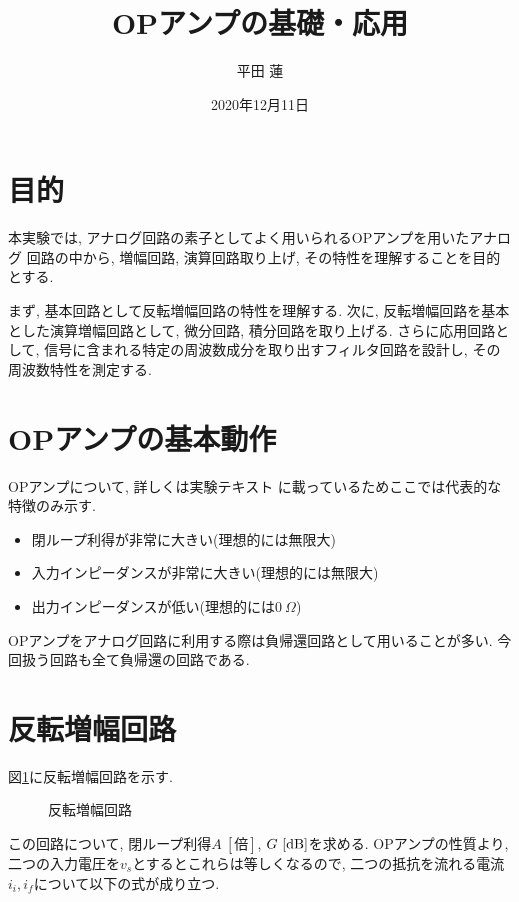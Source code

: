 \documentclass[titlepage]{jsarticle}
\title{OPアンプの基礎・応用}
\author{平田 蓮}
\date{2020年12月11日}
\begin{document}
\maketitle
\section{目的}
    本実験では, アナログ回路の素子としてよく用いられるOPアンプを用いたアナログ
    回路の中から, 増幅回路, 演算回路取り上げ, その特性を理解することを目的とする.

    まず, 基本回路として反転増幅回路の特性を理解する.
    次に, 反転増幅回路を基本とした演算増幅回路として,
    微分回路, 積分回路を取り上げる. さらに応用回路として,
    信号に含まれる特定の周波数成分を取り出すフィルタ回路を設計し,
    その周波数特性を測定する.

\section{OPアンプの基本動作}
    OPアンプについて, 詳しくは実験テキスト\cite{text}
    に載っているためここでは代表的な特徴のみ示す.

    \begin{itemize}
        \item 閉ループ利得が非常に大きい(理想的には無限大)
        \item 入力インピーダンスが非常に大きい(理想的には無限大)
        \item 出力インピーダンスが低い(理想的には$0 \ \Omega$)
    \end{itemize}

    OPアンプをアナログ回路に利用する際は負帰還回路として用いることが多い.
    今回扱う回路も全て負帰還の回路である.

\section{反転増幅回路}
    図\ref{fig:inv-amp}に反転増幅回路を示す.

    \begin{figure}[h]
        \centering
        \caption{反転増幅回路}
        \label{fig:inv-amp}
    \end{figure}

    この回路について, 閉ループ利得$A \ [倍]$, $G \ [\rm{dB}]$を求める.
    OPアンプの性質より, 二つの入力電圧を$v_s$とするとこれらは等しくなるので,
    二つの抵抗を流れる電流$i_i, i_f$について以下の式が成り立つ.
\end{document}
